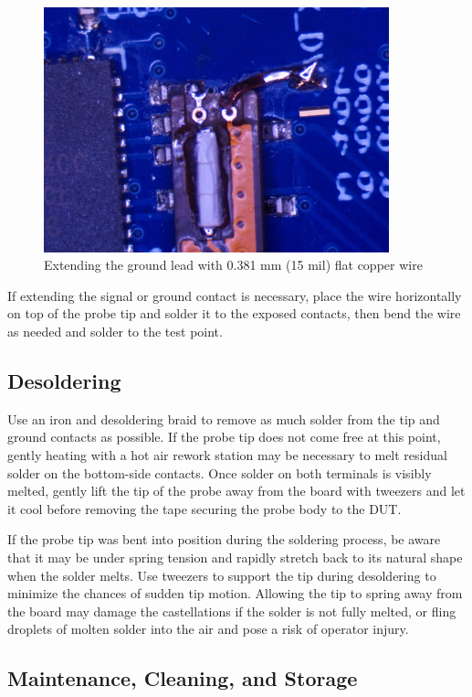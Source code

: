 \documentclass[11pt]{article}
\begin{document}
\begin{figure}[h]
\centering
\includegraphics[width=10cm]{gnd-extend.jpg}
\caption{Extending the ground lead with 0.381 mm (15 mil) flat copper wire}
\label{gnd-extend}
\end{figure}

\FloatBarrier

If extending the signal or ground contact is necessary, place the wire horizontally on top of the probe tip and solder
it to the exposed contacts, then bend the wire as needed and solder to the test point.

\subsection{Desoldering}

Use an iron and desoldering braid to remove as much solder from the tip and ground contacts as possible. If the probe
tip does not come free at this point, gently heating with a hot air rework station may be necessary to melt residual
solder on the bottom-side contacts. Once solder on both terminals is visibly melted, gently lift the tip of the probe
away from the board with tweezers and let it cool before removing the tape securing the probe body to the DUT.

If the probe tip was bent into position during the soldering process, be aware that it may be under spring tension and
rapidly stretch back to its natural shape when the solder melts. Use tweezers to support the tip during desoldering to
minimize the chances of sudden tip motion. Allowing the tip to spring away from the board may damage the castellations
if the solder is not fully melted, or fling droplets of molten solder into the air and pose a risk of operator injury.

\subsection{Maintenance, Cleaning, and Storage}
\end{document}
